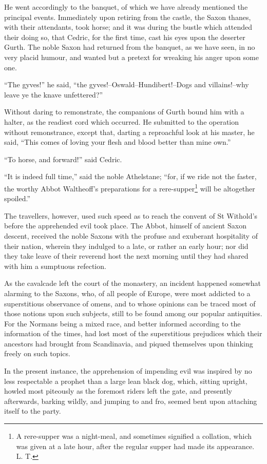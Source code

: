 He went accordingly to the banquet, of which we have already mentioned
the principal events. Immediately upon retiring from the castle, the
Saxon thanes, with their attendants, took horse; and it was during the
bustle which attended their doing so, that Cedric, for the first time,
cast his eyes upon the deserter Gurth. The noble Saxon had returned from
the banquet, as we have seen, in no very placid humour, and wanted but a
pretext for wreaking his anger upon some one.

``The gyves!'' he said, ``the gyves!--Oswald--Hundibert!--Dogs and
villains!--why leave ye the knave unfettered?''

Without daring to remonstrate, the companions of Gurth bound him with a
halter, as the readiest cord which occurred. He submitted to the
operation without remonstrance, except that, darting a reproachful look
at his master, he said, ``This comes of loving your flesh and blood
better than mine own.''

``To horse, and forward!'' said Cedric.

``It is indeed full time,'' said the noble Athelstane; ``for, if we ride
not the faster, the worthy Abbot Waltheoff's preparations for a
rere-supper\footnote{A rere-supper was a night-meal, and sometimes signified
a collation, which was given at a late hour, after the regular supper
had made its appearance. L. T.} will be altogether spoiled.''

The travellers, however, used such speed as to reach the convent of St
Withold's before the apprehended evil took place. The Abbot, himself of
ancient Saxon descent, received the noble Saxons with the profuse and
exuberant hospitality of their nation, wherein they indulged to a late,
or rather an early hour; nor did they take leave of their reverend host
the next morning until they had shared with him a sumptuous refection.

As the cavalcade left the court of the monastery, an incident happened
somewhat alarming to the Saxons, who, of all people of Europe, were most
addicted to a superstitious observance of omens, and to whose opinions
can be traced most of those notions upon such subjects, still to be
found among our popular antiquities. For the Normans being a mixed race,
and better informed according to the information of the times, had lost
most of the superstitious prejudices which their ancestors had brought
from Scandinavia, and piqued themselves upon thinking freely on such
topics.

In the present instance, the apprehension of impending evil was inspired
by no less respectable a prophet than a large lean black dog, which,
sitting upright, howled most piteously as the foremost riders left the
gate, and presently afterwards, barking wildly, and jumping to and fro,
seemed bent upon attaching itself to the party.

